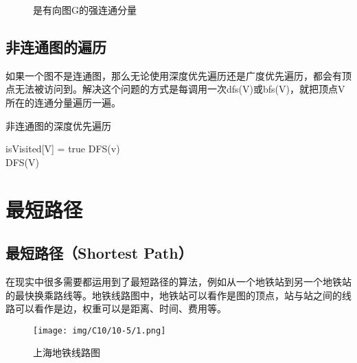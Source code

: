 \begin{figure}[H]
	\centering
	\caption{是有向图G的强连通分量}
\end{figure}

\vspace{0.5cm}

\subsection{非连通图的遍历}

如果一个图不是连通图，那么无论使用深度优先遍历还是广度优先遍历，都会有顶点无法被访问到。解决这个问题的方式是每调用一次dfs(V)或bfs(V)，就把顶点V所在的连通分量遍历一遍。\\

\begin{algorithm}[H]
	\caption{非连通图的深度优先遍历}
	\begin{algorithmic}[1]
		\State isVisited[V] = true
		\State DFS(v)
		\EndIf
		\EndFor
		\EndProcedure
		\\
		\State DFS(V)
		\EndIf
		\EndFor
		\EndProcedure
	\end{algorithmic}
\end{algorithm}

\newpage

\section{最短路径}

\subsection{最短路径（Shortest Path）}

在现实中很多需要都运用到了最短路径的算法，例如从一个地铁站到另一个地铁站的最快换乘路线等。地铁线路图中，地铁站可以看作是图的顶点，站与站之间的线路可以看作是边，权重可以是距离、时间、费用等。\\

\begin{figure}[H]
	\centering
	\texttt{[image: img/C10/10-5/1.png]}
	\caption{上海地铁线路图}
\end{figure}

